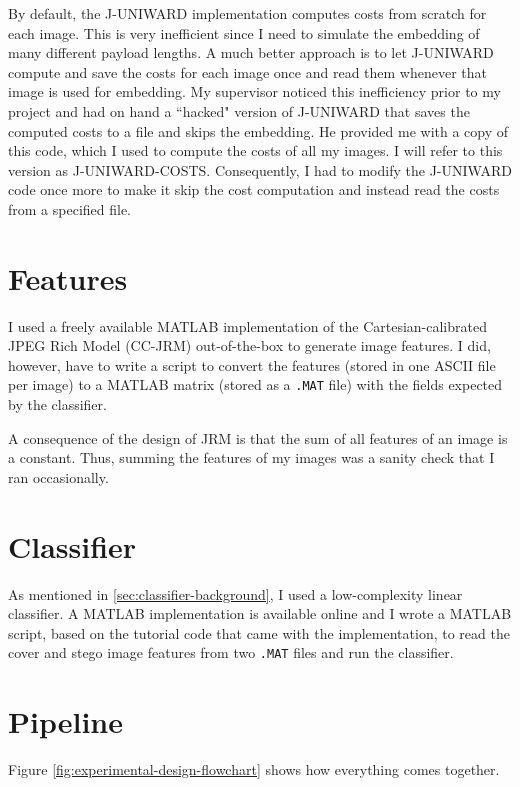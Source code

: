 \documentclass[11pt,a4paper,twoside,openright]{report}
\begin{document}
By default, the J-UNIWARD implementation computes costs from scratch for each image. This is very inefficient since I need to simulate the embedding of many different payload lengths. A much better approach is to let J-UNIWARD compute and save the costs for each image once and read them whenever that image is used for embedding. My supervisor noticed this inefficiency prior to my project and had on hand a ``hacked" version of J-UNIWARD that saves the computed costs to a file and skips the embedding. He provided me with a copy of this code, which I used to compute the costs of all my images. I will refer to this version as J-UNIWARD-COSTS. Consequently, I had to modify the J-UNIWARD code once more to make it skip the cost computation and instead read the costs from a specified file.


\section{Features} \label{sec:features-impl}

I used a freely available \cite{binghamton-features} MATLAB implementation of the Cartesian-calibrated JPEG Rich Model (CC-JRM) out-of-the-box to generate image features. I did, however, have to write a script to convert the features (stored in one ASCII file per image) to a MATLAB matrix (stored as a \texttt{.MAT} file) with the fields expected by the classifier.

A consequence of the design of JRM is that the sum of all features of an image is a constant. Thus, summing the features of my images was a sanity check that I ran occasionally.


\section{Classifier} \label{sec:classifier-impl}

As mentioned in \ref{sec:classifier-background}, I used a low-complexity linear classifier. A MATLAB implementation is available online \cite{binghamton-classifier} and I wrote a MATLAB script, based on the tutorial code that came with the implementation, to read the cover and stego image features from two \texttt{.MAT} files and run the classifier.


\section{Pipeline} \label{sec:pipeline}

Figure \ref{fig:experimental-design-flowchart} shows how everything comes together.
\end{document}
